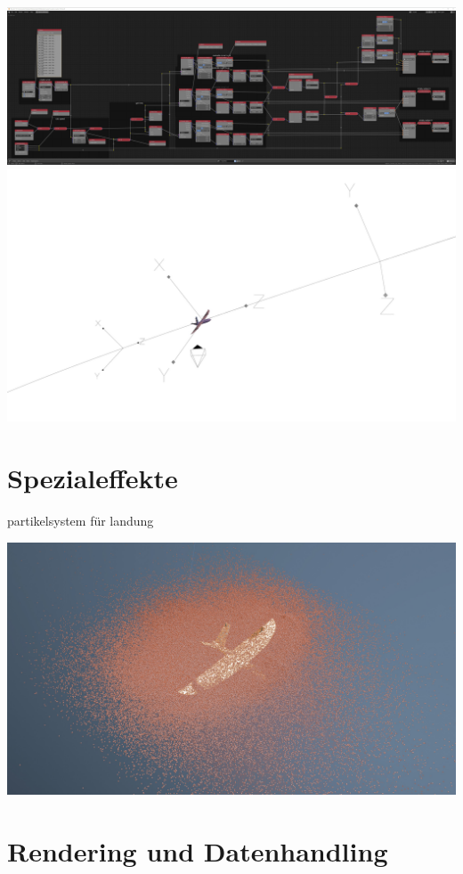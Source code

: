 \includegraphics[width=\textwidth]{gfx/prod/plane/animation_nodes.jpg}
\includegraphics[width=\textwidth]{gfx/prod/plane/an_flight.jpg}

\section{Spezialeffekte}

partikelsystem für landung

\includegraphics[width=\textwidth]{gfx/prod/plane/particles.jpg}

\section{Rendering und Datenhandling}

